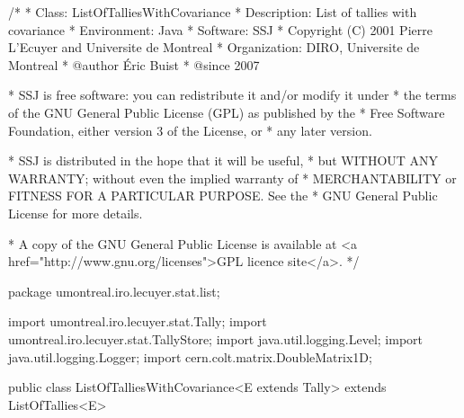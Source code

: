 \begin{code}
\begin{hide}
/*
 * Class:        ListOfTalliesWithCovariance
 * Description:  List of tallies with covariance
 * Environment:  Java
 * Software:     SSJ 
 * Copyright (C) 2001  Pierre L'Ecuyer and Universite de Montreal
 * Organization: DIRO, Universite de Montreal
 * @author       Éric Buist 
 * @since        2007

 * SSJ is free software: you can redistribute it and/or modify it under
 * the terms of the GNU General Public License (GPL) as published by the
 * Free Software Foundation, either version 3 of the License, or
 * any later version.

 * SSJ is distributed in the hope that it will be useful,
 * but WITHOUT ANY WARRANTY; without even the implied warranty of
 * MERCHANTABILITY or FITNESS FOR A PARTICULAR PURPOSE.  See the
 * GNU General Public License for more details.

 * A copy of the GNU General Public License is available at
   <a href="http://www.gnu.org/licenses">GPL licence site</a>.
 */
\end{hide}
package umontreal.iro.lecuyer.stat.list;\begin{hide}

import umontreal.iro.lecuyer.stat.Tally;
import umontreal.iro.lecuyer.stat.TallyStore;
import java.util.logging.Level;
import java.util.logging.Logger;
import cern.colt.matrix.DoubleMatrix1D;
\end{hide}


public class ListOfTalliesWithCovariance<E extends Tally>
       extends ListOfTallies<E>\begin{hide} {
   private double[] tempArray;
   private double[][] sxy;

   // Determines if we use a numerically stable covariance
   // formula.
   private boolean isStable = true;

   // The average of the first observations, for each tally
   private double[] curAverages;

   // The sum (xi - average)(yi - average) of the first observations
   private double[][] curSum2;
   private Logger log = Logger.getLogger ("umontreal.iro.lecuyer.stat.list");
\end{hide}
\end{code}
